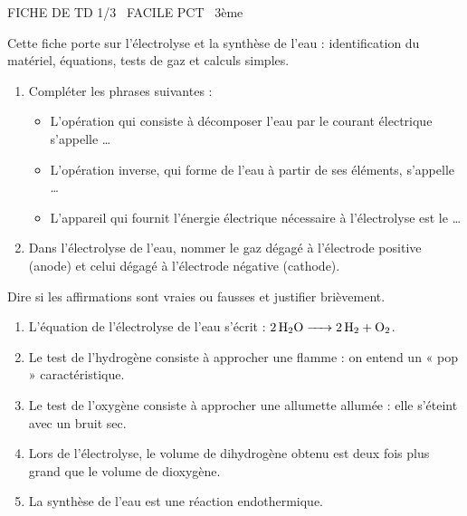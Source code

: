 \documentclass[11pt]{article}
\begin{document}
\begin{tcolorbox}[enhanced,colback=popink,colframe=popink,arc=10pt,boxrule=0pt,left=12pt,right=12pt,top=9pt,bottom=9pt]
{\color{white}\popxbold\small FICHE DE TD 1/3 \textbullet\ FACILE \hfill PCT \textbullet\ 3ème\par}
\end{tcolorbox}
\vspace{4pt}
Cette fiche porte sur l'électrolyse et la synthèse de l'eau : identification du matériel, équations, tests de gaz et calculs simples.

\begin{exercice}
\begin{enumerate}
    \item Compléter les phrases suivantes :
    \begin{itemize}
        \item L'opération qui consiste à décomposer l'eau par le courant électrique s'appelle \ldots
        \item L'opération inverse, qui forme de l'eau à partir de ses éléments, s'appelle \ldots
        \item L'appareil qui fournit l'énergie électrique nécessaire à l'électrolyse est le \ldots
    \end{itemize}
    \item Dans l'électrolyse de l'eau, nommer le gaz dégagé à l'électrode positive (anode) et celui dégagé à l'électrode négative (cathode).
\end{enumerate}
\end{exercice}

\begin{exercice}
Dire si les affirmations sont vraies ou fausses et justifier brièvement.
\begin{enumerate}
    \item L'équation de l'électrolyse de l'eau s'écrit : $\ce{2 H2O -> 2 H2 + O2}$.
    \item Le test de l'hydrogène consiste à approcher une flamme : on entend un « pop » caractéristique.
    \item Le test de l'oxygène consiste à approcher une allumette allumée : elle s'éteint avec un bruit sec.
    \item Lors de l'électrolyse, le volume de dihydrogène obtenu est deux fois plus grand que le volume de dioxygène.
    \item La synthèse de l'eau est une réaction endothermique.
\end{enumerate}
\end{exercice}
\end{document}
